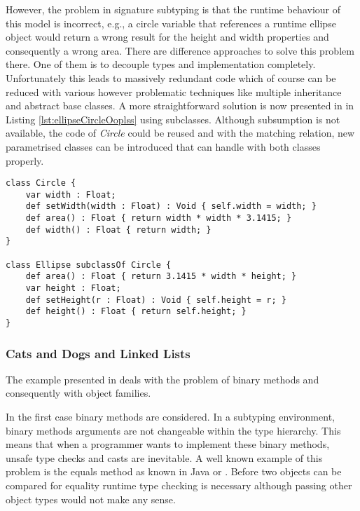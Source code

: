 However, the problem in signature subtyping is that the runtime behaviour
of this model is incorrect, e.g., a circle variable that references a
runtime ellipse object would return a wrong result for the height and
width properties and consequently a wrong area. There are difference
approaches to solve this problem there. One of them is to decouple types
and implementation completely. Unfortunately this leads to massively
redundant code which of course can be reduced with various however
problematic techniques like multiple inheritance and abstract base
classes. A more straightforward solution is now presented in \ooplss
in Listing \ref{lst:ellipseCircleOoplss} using subclasses. Although
subsumption is not available, the code of \emph{Circle} could be
reused and with the matching relation, new parametrised classes can be
introduced that can handle with both classes properly.

\begin{lstlisting}[float=ht,language=ooplss,caption=Circle-Ellipse problem in \ooplss.,label=lst:ellipseCircleOoplss]
class Circle {
	var width : Float;
	def setWidth(width : Float) : Void { self.width = width; }
	def area() : Float { return width * width * 3.1415; }
	def width() : Float { return width; }
}

class Ellipse subclassOf Circle {
	def area() : Float { return 3.1415 * width * height; }
	var height : Float;
	def setHeight(r : Float) : Void { self.height = r; }
	def height() : Float { return self.height; }
}
\end{lstlisting}

\subsubsection{Cats and Dogs and Linked Lists}
The example presented in  deals with the
problem of binary methods and consequently with object families.

In the first case binary methods are considered. In a subtyping
environment, binary methods arguments are not changeable within the type
hierarchy. This means that when a programmer wants to implement these
binary methods, unsafe type checks and casts are inevitable. A well
known example of this problem is the equals method as known in Java or
\cs. Before two objects can be compared for equality runtime type checking
is necessary although passing other object types would not make any sense.

